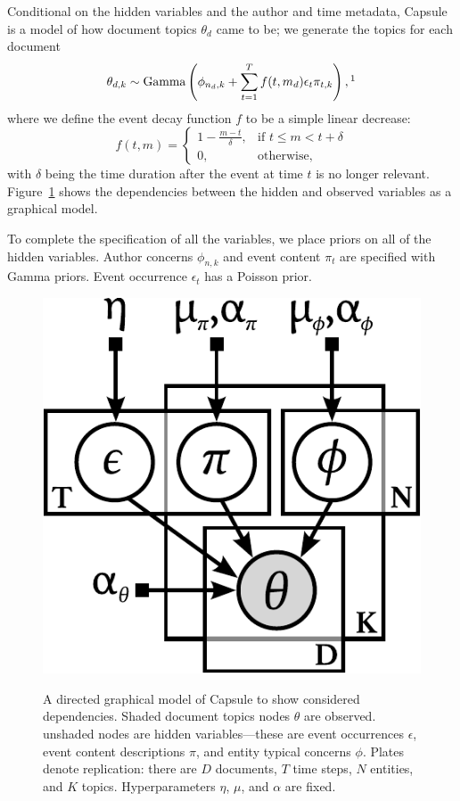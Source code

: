 Conditional on the hidden variables and the author and time metadata, Capsule is a model of how document topics $\theta_d$ came to be; we generate the topics for each document
\begin{equation}
\theta_{d,k} \sim \mbox{Gamma}\left(\phi_{n_d,k} + \sum_{t=1}^T f(t, m_d) \epsilon_t \pi_{t,k}\right),\footnotemark
\end{equation}
where we define the event decay function $f$ to be a simple linear decrease: \[f(t, m) =
\begin{cases}
  1 - \frac{m-t}{\delta}, & \mbox{if } t \le m < t+\delta \\
  0, & \mbox{otherwise,}
\end{cases} \] with $\delta$ being the time duration after the event at time $t$ is no longer relevant.  Figure~\ref{fig:graphicalmodel} shows the dependencies between the hidden and observed variables as a graphical model.

To complete the specification of all the variables, we place priors on all of the hidden variables.  Author concerns $\phi_{n,k}$ and event content $\pi_t$ are specified with Gamma priors.  Event occurrence $\epsilon_t$ has a Poisson prior.

\begin{figure}
\centering
\includegraphics[width=0.5\linewidth]{fig/graphicalmodel.pdf}
\label{fig:graphicalmodel}
\vskip -6pt
\caption{A directed graphical model of Capsule to show considered dependencies. Shaded document topics nodes $\theta$ are observed. unshaded nodes are hidden variables---these are event occurrences $\epsilon$, event content descriptions $\pi$, and entity typical concerns $\phi$. Plates denote replication: there are $D$ documents, $T$ time steps, $N$ entities, and $K$ topics. Hyperparameters $\eta$, $\mu$, and $\alpha$ are fixed.}
\end{figure}

